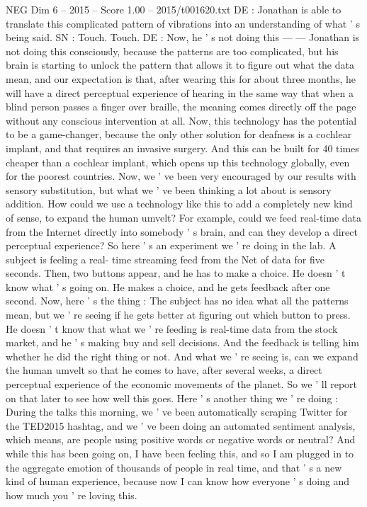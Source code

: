 \begin{textsample}{NEG Dim 6 – 2015 – Score 1.00 – 2015/t001620.txt}
DE : Jonathan is able to translate this complicated pattern of vibrations into an understanding of what ' s being said.
SN : Touch.
Touch.
DE : Now, he ' s not doing this — — Jonathan is not doing this consciously, because the patterns are too complicated, but his brain is starting to unlock the pattern that allows it to figure out what the data mean, and our expectation is that, after wearing this for about three months, he will have a direct perceptual experience of hearing in the same way that when a blind person passes a finger over braille, the meaning comes directly off the page without any conscious intervention at all.
Now, this technology has the potential to be a game-changer, because the only other solution for deafness is a cochlear implant, and that requires an invasive surgery.
And this can be built for 40 times cheaper than a cochlear implant, which opens up this technology globally, even for the poorest countries.
Now, we ' ve been very encouraged by our results with sensory substitution, but what we ' ve been thinking a lot about is sensory addition.
How could we use a technology like this to add a completely new kind of sense, to expand the human umvelt?
For example, could we feed real-time data from the Internet directly into somebody ' s brain, and can they develop a direct perceptual experience?
So here ' s an experiment we ' re doing in the lab.
A subject is feeling a real- time streaming feed from the Net of data for five seconds.
Then, two buttons appear, and he has to make a choice.
He doesn ' t know what ' s going on.
He makes a choice, and he gets feedback after one second.
Now, here ' s the thing : The subject has no idea what all the patterns mean, but we ' re seeing if he gets better at figuring out which button to press.
He doesn ' t know that what we ' re feeding is real-time data from the stock market, and he ' s making buy and sell decisions.
And the feedback is telling him whether he did the right thing or not.
And what we ' re seeing is, can we expand the human umvelt so that he comes to have, after several weeks, a direct perceptual experience of the economic movements of the planet.
So we ' ll report on that later to see how well this goes.
Here ' s another thing we ' re doing : During the talks this morning, we ' ve been automatically scraping Twitter for the TED2015 hashtag, and we ' ve been doing an automated sentiment analysis, which means, are people using positive words or negative words or neutral?
And while this has been going on, I have been feeling this, and so I am plugged in to the aggregate emotion of thousands of people in real time, and that ' s a new kind of human experience, because now I can know how everyone ' s doing and how much you ' re loving this.

\end{textsample}
